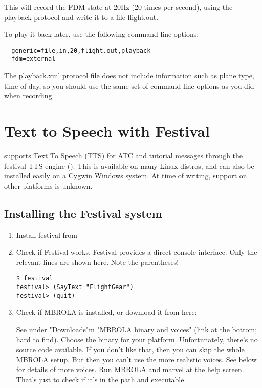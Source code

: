 \begin{enumerate}
This will record the FDM state at 20Hz (20 times per second), using the playback
protocol and write it to a file flight.out.

To play it back later, use the following command line options:

\begin{verbatim}
--generic=file,in,20,flight.out,playback
--fdm=external
\end{verbatim}

The playback.xml protocol file does not include information such as plane type,
time of day, so you should use the same set of command line options as you
did when recording.

\section{Text to Speech with Festival}

\FlightGear{} supports Text To Speech (TTS) for ATC and tutorial messages through the festival TTS
engine (). This is available on many Linux distros,
and can also be installed easily on a Cygwin Windows system. At time of writing, support on other platforms is unknown.

\subsection{Installing the Festival system}

\begin{enumerate}
\item Install festival from 

\item Check if Festival works. Festival provides a direct console interface. Only the relevant lines are
shown here. Note the parentheses!

\begin{verbatim}
$ festival
festival> (SayText "FlightGear")
festival> (quit)
\end{verbatim}

\item Check if MBROLA is installed, or download it from here:


See under "Downloads"m "MBROLA binary and voices"
(link at the bottom; hard to find). Choose the binary for your platform. Unfortunately, there's no
source code available. If you don't like that, then you can skip the whole MBROLA setup.
But then you can't use the more realistic voices. See below for details of more voices.
Run MBROLA and marvel at the help screen. That's just to check if it's in the path and executable.


\end{enumerate}
\end{enumerate}
